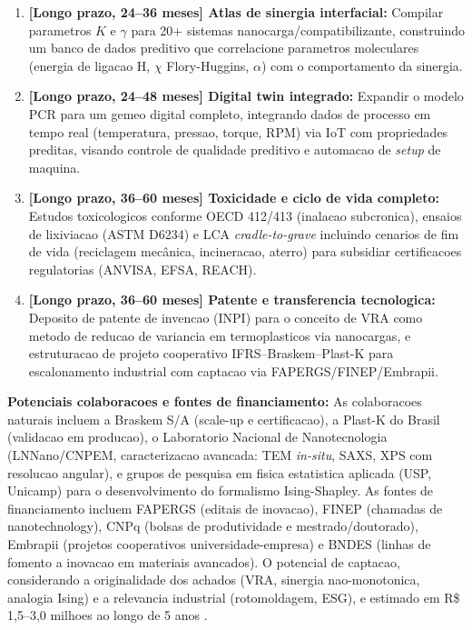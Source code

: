 \documentclass[11pt,a4paper,oneside]{article}
\begin{document}
\begin{enumerate}[label=(\alph*),nosep,leftmargin=*]
    \item {\bfseries [Longo prazo, 24--36 meses] Atlas de sinergia interfacial:} Compilar parametros $K$ e $\gamma$ para 20+ sistemas nanocarga/compatibilizante, construindo um banco de dados preditivo que correlacione parametros moleculares (energia de ligacao H, $\chi$ Flory-Huggins, $\alpha$) com o comportamento da sinergia.
    \item {\bfseries [Longo prazo, 24--48 meses] Digital twin integrado:} Expandir o modelo PCR para um gemeo digital completo, integrando dados de processo em tempo real (temperatura, pressao, torque, RPM) via IoT com propriedades preditas, visando controle de qualidade preditivo e automacao de \textit{setup} de maquina.
    \item {\bfseries [Longo prazo, 36--60 meses] Toxicidade e ciclo de vida completo:} Estudos toxicologicos conforme OECD 412/413 (inalacao subcronica), ensaios de lixiviacao (ASTM D6234) e LCA \textit{cradle-to-grave} incluindo cenarios de fim de vida (reciclagem mecânica, incineracao, aterro) para subsidiar certificacoes regulatorias (ANVISA, EFSA, REACH).
    \item {\bfseries [Longo prazo, 36--60 meses] Patente e transferencia tecnologica:} Deposito de patente de invencao (INPI) para o conceito de VRA como metodo de reducao de variancia em termoplasticos via nanocargas, e estruturacao de projeto cooperativo IFRS--Braskem--Plast-K para escalonamento industrial com captacao via FAPERGS/FINEP/Embrapii.
\end{enumerate}

{\bfseries Potenciais colaboracoes e fontes de financiamento:} As colaboracoes naturais incluem a Braskem S/A (scale-up e certificacao), a Plast-K do Brasil (validacao em producao), o Laboratorio Nacional de Nanotecnologia (LNNano/CNPEM, caracterizacao avancada: TEM \textit{in-situ}, SAXS, XPS com resolucao angular), e grupos de pesquisa em fisica estatistica aplicada (USP, Unicamp) para o desenvolvimento do formalismo Ising-Shapley. As fontes de financiamento incluem FAPERGS (editais de inovacao), FINEP (chamadas de nanotechnology), CNPq (bolsas de produtividade e mestrado/doutorado), Embrapii (projetos cooperativos universidade-empresa) e BNDES (linhas de fomento a inovacao em materiais avancados). O potencial de captacao, considerando a originalidade dos achados (VRA, sinergia nao-monotonica, analogia Ising) e a relevancia industrial (rotomoldagem, ESG), e estimado em R\$ 1,5--3,0 milhoes ao longo de 5 anos \cite{Montgomery2020, Taguchi1986}.
\end{document}
